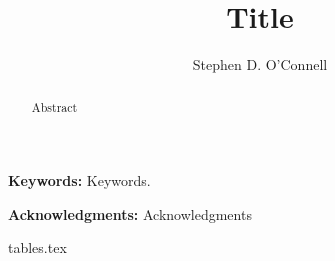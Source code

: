 \documentclass[12pt,letterpaper,oneside]{article}
\begin{document}
\title{Title}
\author{Stephen D. O'Connell}

  
\maketitle 
\begin{abstract}
\singlespace \noindent Abstract
\end{abstract}

\textbf{Keywords:} 
Keywords.

\singlespace 
\textbf{Acknowledgments:} Acknowledgments

\newpage
\doublespace



\clearpage


\newpage



{tables.tex}
\end{document}
